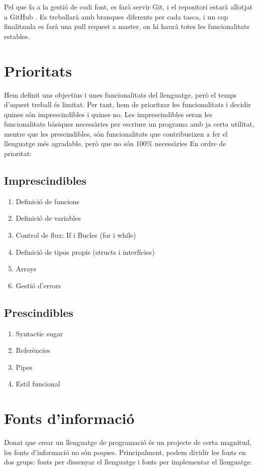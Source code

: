 ﻿\documentclass{article}
\begin{document}
Pel que fa a la gestió de codi font, es farà servir Git, i el repositori estarà
allotjat a GitHub \cite{repo}. Es treballarà amb branques diferents per cada
tasca, i un cop finalitzada es farà una pull request a master, on hi haurà
totes les funcionalitats estables.

\section{Prioritats}
Hem definit uns objectius i unes funcionalitats del llenguatge, però el temps
d'aquest treball és limitat. Per tant, hem de prioritzar les funcionalitats i
decidir quines són imprescindibles i quines no. Les imprescindibles seran les
funcionalitats bàsiques necessàries per escriure un programa amb ja certa
utilitat, mentre que les prescindibles, són funcionalitats que contribueixen a
fer el llenguatge més agradable, però que no són 100\% necessàries
En ordre de prioritat:

\subsection{Imprescindibles}
\begin{enumerate}
    \item Definició de funcions
    \item Definició de variables
    \item Control de flux: If i Bucles (for i while)
    \item Definició de tipus propis (structs i interfícies)
    \item Arrays
    \item Gestió d'errors
\end{enumerate}

\subsection{Prescindibles}
\begin{enumerate}
    \item Syntactic sugar
    \item Referències
    \item Pipes
    \item Estil funcional
\end{enumerate}

\section{Fonts d'informació}
Donat que crear un llenguatge de programació és un projecte de certa magnitud,
les fonts d'informació no són poques. Principalment, podem dividir les fonts en
dos grups: fonts per dissenyar el llenguatge i fonts per implementar el llenguatge.
\end{document}
